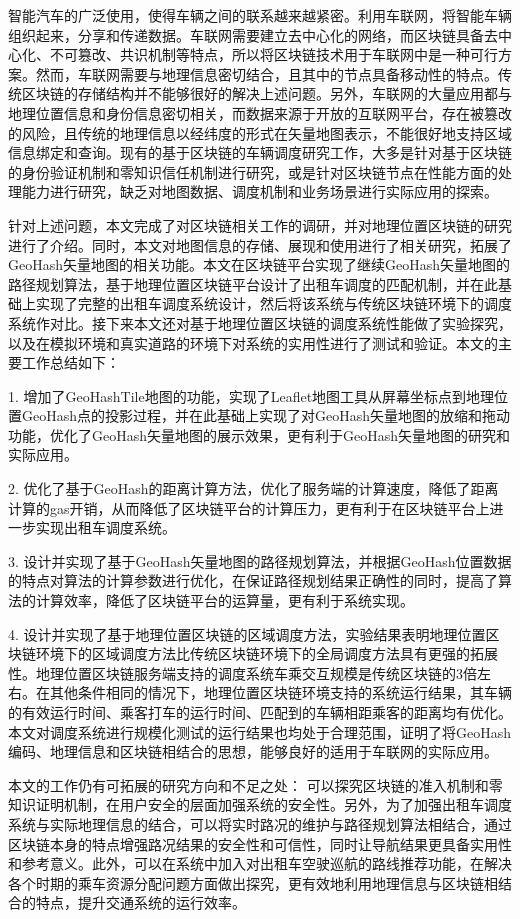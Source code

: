 

\begin{conclusion}

智能汽车的广泛使用，使得车辆之间的联系越来越紧密。利用车联网，将智能车辆组织起来，分享和传递数据。车联网需要建立去中心化的网络，而区块链具备去中心化、不可篡改、共识机制等特点，所以将区块链技术用于车联网中是一种可行方案。然而，车联网需要与地理信息密切结合，且其中的节点具备移动性的特点。传统区块链的存储结构并不能够很好的解决上述问题。另外，车联网的大量应用都与地理位置信息和身份信息密切相关，而数据来源于开放的互联网平台，存在被篡改的风险，且传统的地理信息以经纬度的形式在矢量地图表示，不能很好地支持区域信息绑定和查询。现有的基于区块链的车辆调度研究工作，大多是针对基于区块链的身份验证机制和零知识信任机制进行研究，或是针对区块链节点在性能方面的处理能力进行研究，缺乏对地图数据、调度机制和业务场景进行实际应用的探索。

针对上述问题，本文完成了对区块链相关工作的调研，并对地理位置区块链的研究进行了介绍。同时，本文对地图信息的存储、展现和使用进行了相关研究，拓展了GeoHash矢量地图的相关功能。本文在区块链平台实现了继续GeoHash矢量地图的路径规划算法，基于地理位置区块链平台设计了出租车调度的匹配机制，并在此基础上实现了完整的出租车调度系统设计，然后将该系统与传统区块链环境下的调度系统作对比。接下来本文还对基于地理位置区块链的调度系统性能做了实验探究，以及在模拟环境和真实道路的环境下对系统的实用性进行了测试和验证。本文的主要工作总结如下：

1. 增加了GeoHashTile地图的功能，实现了Leaflet地图工具从屏幕坐标点到地理位置GeoHash点的投影过程，并在此基础上实现了对GeoHash矢量地图的放缩和拖动功能，优化了GeoHash矢量地图的展示效果，更有利于GeoHash矢量地图的研究和实际应用。

2. 优化了基于GeoHash的距离计算方法，优化了服务端的计算速度，降低了距离计算的gas开销，从而降低了区块链平台的计算压力，更有利于在区块链平台上进一步实现出租车调度系统。

3. 设计并实现了基于GeoHash矢量地图的路径规划算法，并根据GeoHash位置数据的特点对算法的计算参数进行优化，在保证路径规划结果正确性的同时，提高了算法的计算效率，降低了区块链平台的运算量，更有利于系统实现。

4. 设计并实现了基于地理位置区块链的区域调度方法，实验结果表明地理位置区块链环境下的区域调度方法比传统区块链环境下的全局调度方法具有更强的拓展性。地理位置区块链服务端支持的调度系统车乘交互规模是传统区块链的3倍左右。在其他条件相同的情况下，地理位置区块链环境支持的系统运行结果，其车辆的有效运行时间、乘客打车的运行时间、匹配到的车辆相距乘客的距离均有优化。本文对调度系统进行规模化测试的运行结果也均处于合理范围，证明了将GeoHash编码、地理信息和区块链相结合的思想，能够良好的适用于车联网的实际应用。

本文的工作仍有可拓展的研究方向和不足之处：
可以探究区块链的准入机制和零知识证明机制，在用户安全的层面加强系统的安全性。另外，为了加强出租车调度系统与实际地理信息的结合，可以将实时路况的维护与路径规划算法相结合，通过区块链本身的特点增强路况结果的安全性和可信性，同时让导航结果更具备实用性和参考意义。此外，可以在系统中加入对出租车空驶巡航的路线推荐功能，在解决各个时期的乘车资源分配问题方面做出探究，更有效地利用地理信息与区块链相结合的特点，提升交通系统的运行效率。

\end{conclusion}